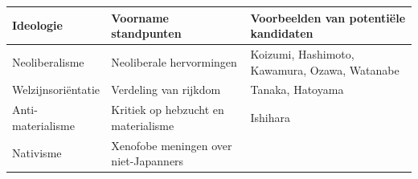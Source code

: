 \documentclass[10.5pt,dutch,]{article}
\begin{document}
\begin{longtable}[]{@{}lll@{}}
\toprule
\begin{minipage}[b]{0.21\columnwidth}\raggedright\strut
Ideologie
\strut\end{minipage} &
\begin{minipage}[b]{0.35\columnwidth}\raggedright\strut
Voorname standpunten
\strut\end{minipage} &
\begin{minipage}[b]{0.35\columnwidth}\raggedright\strut
Voorbeelden van potentiële kandidaten
\strut\end{minipage}\tabularnewline
\midrule
\endhead
\begin{minipage}[t]{0.21\columnwidth}\raggedright\strut
Neoliberalisme
\strut\end{minipage} &
\begin{minipage}[t]{0.35\columnwidth}\raggedright\strut
Neoliberale hervormingen
\strut\end{minipage} &
\begin{minipage}[t]{0.35\columnwidth}\raggedright\strut
Koizumi, Hashimoto, Kawamura, Ozawa, Watanabe
\strut\end{minipage}\tabularnewline
\begin{minipage}[t]{0.21\columnwidth}\raggedright\strut
Welzijnsoriëntatie
\strut\end{minipage} &
\begin{minipage}[t]{0.35\columnwidth}\raggedright\strut
Verdeling van rijkdom
\strut\end{minipage} &
\begin{minipage}[t]{0.35\columnwidth}\raggedright\strut
Tanaka, Hatoyama
\strut\end{minipage}\tabularnewline
\begin{minipage}[t]{0.21\columnwidth}\raggedright\strut
Anti-materialisme
\strut\end{minipage} &
\begin{minipage}[t]{0.35\columnwidth}\raggedright\strut
Kritiek op hebzucht en materialisme
\strut\end{minipage} &
\begin{minipage}[t]{0.35\columnwidth}\raggedright\strut
Ishihara
\strut\end{minipage}\tabularnewline
\begin{minipage}[t]{0.21\columnwidth}\raggedright\strut
Nativisme
\strut\end{minipage} &
\begin{minipage}[t]{0.35\columnwidth}\raggedright\strut
Xenofobe meningen over niet-Japanners

\end{minipage}
\end{longtable}
\end{document}
